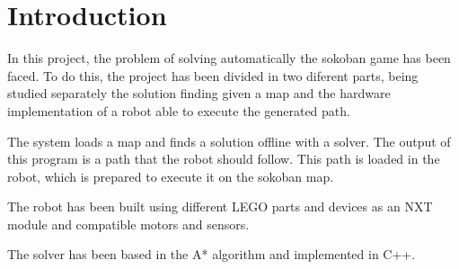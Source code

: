 \section{Introduction}

In this project, the problem of solving automatically the sokoban game has been faced.
To do this, the project has been divided in two diferent parts, being studied separately the solution finding given a map and the hardware implementation of a robot able to execute the generated path.

The system loads a map and finds a solution offline with a solver. 
The output of this program is a path that the robot should follow. 
This path is loaded in the robot, which is prepared to execute it on the sokoban map.

The robot has been built using different LEGO parts and devices as an NXT module and compatible motors and sensors.

The solver has been based in the A* algorithm and implemented in C++.